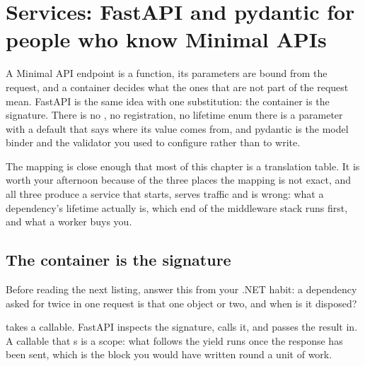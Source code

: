 
\chapter{Services: FastAPI and pydantic for people who know Minimal APIs}
\label{ch:services}

\noindent
A Minimal API endpoint is a function, its parameters are bound from the
request, and a container decides what the ones that are not part of the
request mean. FastAPI is the same idea with one substitution: the container
is the signature. There is no , no registration, no
lifetime enum \dash{} there is a parameter with a default that says where its
value comes from, and pydantic is the model binder and the validator you used
to configure rather than to write.

The mapping is close enough that most of this chapter is a translation table.
It is worth your afternoon because of the three places the mapping is not
exact, and all three produce a service that starts, serves traffic and is
wrong: what a dependency's lifetime actually is, which end of the middleware
stack runs first, and what a worker buys you.


\section{The container is the signature}
\label{sec:ch09-depends}

Before reading the next listing, answer this from your .NET habit: a
dependency asked for twice in one request \dash{} is that one object or two,
and when is it disposed?


\noindent
{} takes a callable. FastAPI inspects the signature, calls it,
and passes the result in. A callable that s is a scope: what
follows the yield runs once the response has been sent, which is the
 block you would have written round a unit of work.

